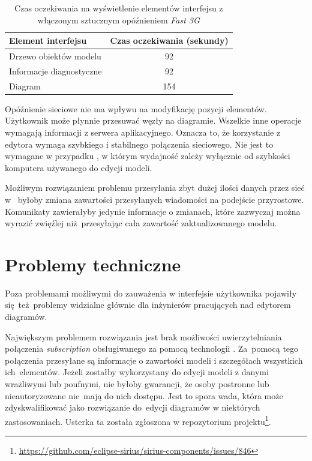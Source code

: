\begin{table}[h]
	\centering
	\begin{tabular}{p{5cm}c}
		\toprule
		Element interfejsu       & Czas oczekiwania (sekundy) \\
		\midrule
		Drzewo obiektów modelu   & 92                         \\
		Informacje diagnostyczne & 92                         \\
		Diagram                  & 154                        \\
		\bottomrule
	\end{tabular}
	\caption{Czas oczekiwania na wyświetlenie elementów interfejsu
		\SiriusWeb{} z włączonym sztucznym opóźnieniem \emph{Fast
			3G}}\label{tab:sirius-web-ui-delay-throttled}
\end{table}

Opóźnienie sieciowe nie ma wpływu na modyfikację pozycji elementów. Użytkownik
może płynnie przesuwać węzły na diagramie. Wszelkie inne operacje wymagają
informacji z serwera aplikacyjnego. Oznacza to, że korzystanie z edytora
\SiriusWeb{} wymaga szybkiego i stabilnego połączenia sieciowego. Nie jest
to wymagane w przypadku \SiriusDesktop{}, w którym wydajność zależy
wyłącznie od szybkości komputera używanego do edycji modeli.

Możliwym rozwiązaniem problemu przesyłania zbyt dużej ilości danych przez sieć
w~\SiriusWeb{} byłoby zmiana zawartości przesyłanych wiadomości na
podejście przyrostowe. Komunikaty zawierałyby jedynie informacje o zmianach,
które zazwyczaj można wyrazić zwięźlej niż~przesyłając cała zawartość
zaktualizowanego modelu.

\section{Problemy techniczne}

Poza problemami możliwymi do zauważenia w interfejsie użytkownika \SiriusWeb{}
pojawiły się~też~problemy widzialne głównie dla inżynierów
pracujących nad edytorem diagramów.

Największym problemem rozwiązania \SiriusWeb{} jest brak możliwości
uwierzytelniania połączenia \GraphQL{} \emph{subscription} obsługiwanego za
pomocą technologii \WebSocket{}. Za~pomocą tego połączenia przesyłane są
informacje o zawartości modeli i szczegółach wszystkich ich~elementów. Jeżeli
\SiriusWeb{} zostałby wykorzystany do edycji modeli z danymi wrażliwymi
lub poufnymi, nie byłoby gwarancji, że osoby postronne lub nieautoryzowane
nie~mają do nich dostępu. Jest to spora wada, która może zdyskwalifikować
\SiriusWeb{} jako rozwiązanie do~edycji diagramów w niektórych
zastosowaniach. Usterka ta została zgłoszona w repozytorium
projektu\footnote{
	\url{https://github.com/eclipse-sirius/sirius-components/issues/846}}.

